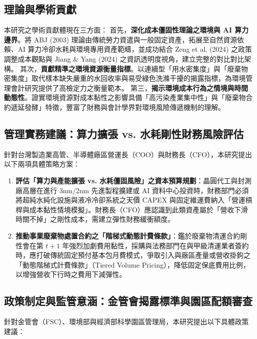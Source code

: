 \documentclass[12pt,a4paper]{article}
\begin{document}
\subsection{理論與學術貢獻}

本研究之學術貢獻體現在三方面：
首先，\textbf{深化成本僵固性理論之環境與 AI 算力邊界}。將 ABJ (2003) 理論由傳統勞力資遣與一般固定資產，拓展至自然資源依賴、AI 算力冷卻水耗與環境專用資產範疇，並成功結合 Zeng et al. (2024) 之政策調整成本觀點與 Jiang \& Yang (2024) 之資訊透明度視角，建立完整的對比對比架構。
其次，\textbf{貢獻精準之環境資源衡量指標}。以連續型「用水密集度」與「廢棄物密集度」取代樣本缺失嚴重的水回收率與易受綠色洗滌干擾的揭露指標，為環境管理會計研究提供了高檢定力之衡量範本。
第三，\textbf{揭示環境成本行為之情境與時間動態性}。證實環境資源對成本黏性之影響具備「高污染產業集中性」與「廢棄物合約遞延發酵」特徵，豐富了財務與會計學界對環境風險傳遞機制的理解。

\subsection{管理實務建議：算力擴張 vs. 水耗剛性財務風險評估}

針對台灣製造業高管、半導體廠區營運長（COO）與財務長（CFO），本研究提出以下兩項具體策略方案：

\begin{enumerate}[leftmargin=*]
    \item \textbf{評估「算力與產能擴張 vs. 水耗僵固風險」之資本預算規劃}：晶圓代工與封測廠高層在進行 3nm/2nm 先進製程擴建或 AI 資料中心投資時，財務部門必須將超純水純化設施與液冷冷卻系統之天價 CAPEX 與固定維運費納入「營運槓桿與成本黏性情境模擬」。財務長（CFO）應認識到此類資產屬於「營收下滑時關不掉」之剛性成本，需建立彈性財務緩衝額度。
    \item \textbf{推動事業廢棄物處置合約之「階梯式動態計費條款」}：鑑於廢棄物清運合約剛性會在第 $t+1$ 年強烈加劇費用黏性，採購與法務部門在與甲級清運業者簽約時，應打破傳統固定預付基本包月費模式，爭取引入與廠區產量或營收掛鉤之「動態階梯式計費條款」（Tiered Volume Pricing），降低固定保底費用比例，以增強營收下行時之費用下減彈性。
\end{enumerate}

\subsection{政策制定與監管意涵：金管會揭露標準與園區配額審查}

針對金管會（FSC）、環境部與經濟部科學園區管理局，本研究提出以下具體政策建議：
\end{document}
